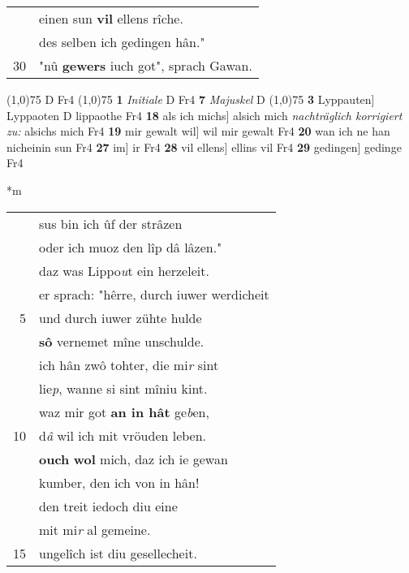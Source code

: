 \documentclass[8pt,a4paper,notitlepage]{article}
\begin{document}
\begin{table}[ht]
\begin{minipage}[t]{0.5\linewidth}
\begin{tabular}{rl}
 & einen sun \textbf{vil} ellens rîche.\\ 
 & des selben ich gedingen hân."\\ 
30 & "nû \textbf{gewers} iuch got", sprach Gawan.\\ 
\end{tabular}
\scriptsize
\line(1,0){75} \newline
D Fr4 \newline
\line(1,0){75} \newline
\textbf{1} \textit{Initiale} D Fr4  \textbf{7} \textit{Majuskel} D  \newline
\line(1,0){75} \newline
\textbf{3} Lyppauten] Lyppaoten D lippaothe Fr4 \textbf{18} als ich michs] alsich mich \textit{nachträglich korrigiert zu:} alsichs mich Fr4 \textbf{19} mir gewalt wil] wil mir gewalt Fr4 \textbf{20} wan ich ne han nicheinin sun Fr4 \textbf{27} im] ir Fr4 \textbf{28} vil ellens] ellins vil Fr4 \textbf{29} gedingen] gedinge Fr4 \newline
\end{minipage}
\hspace{0.5cm}
\begin{minipage}[t]{0.5\linewidth}
\small
\begin{center}*m
\end{center}
\begin{tabular}{rl}
 & sus bin ich ûf der strâzen\\ 
 & oder ich muoz den lîp dâ lâzen."\\ 
 & daz was Lippo\textit{u}t ein herzeleit.\\ 
 & er sprach: "hêrre, durch iuwer werdicheit\\ 
5 & und durch iuwer zühte hulde\\ 
 & \textbf{sô} vernemet mîne unschulde.\\ 
 & ich hân zwô tohter, die mi\textit{r} sint\\ 
 & lie\textit{p}, wanne si sint mîniu kint.\\ 
 & waz mir got \textbf{an in hât} ge\textit{b}en,\\ 
10 & d\textit{â} wil ich mit vröuden leben.\\ 
 & \textbf{ouch} \textbf{wol} mich, daz ich ie gewan\\ 
 & kumber, den ich von in hân!\\ 
 & den treit iedoch diu eine\\ 
 & mit mi\textit{r} al gemeine.\\ 
15 & ungelîch ist diu gesellecheit.\\ 

\end{tabular}
\end{minipage}
\end{table}
\end{document}
